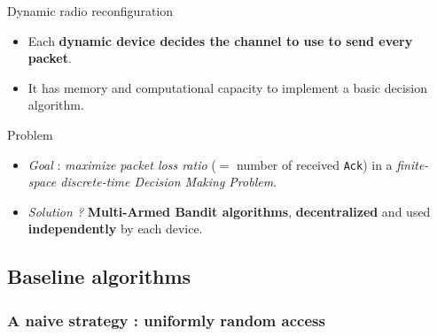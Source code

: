 \begin{frameO}[Hypotheses ($2/2$)]

    \begin{colorblock}{Dynamic radio reconfiguration}

        \begin{itemize}
            \item
                  Each \textbf{dynamic device decides the channel to use to send every
                      packet}.
            \item
                  It has memory and computational capacity to implement a basic decision
                  algorithm.
        \end{itemize}

    \end{colorblock}

    \vspace*{20pt}

    \begin{lightblock}{Problem}

        \begin{itemize}
            \item
                  \emph{Goal} : \emph{maximize packet loss ratio} (\(=\) number of
                  received \texttt{Ack}) in a \emph{finite-space discrete-time Decision
                      Making Problem}.
            \item
                  \emph{Solution ?} \textbf{Multi-Armed Bandit algorithms},
                  \textbf{decentralized} and used \textbf{independently} by each device.
        \end{itemize}

    \end{lightblock}

\end{frameO}



\subsection{Baseline algorithms}

\subsubsection{A naive strategy : uniformly random access}

